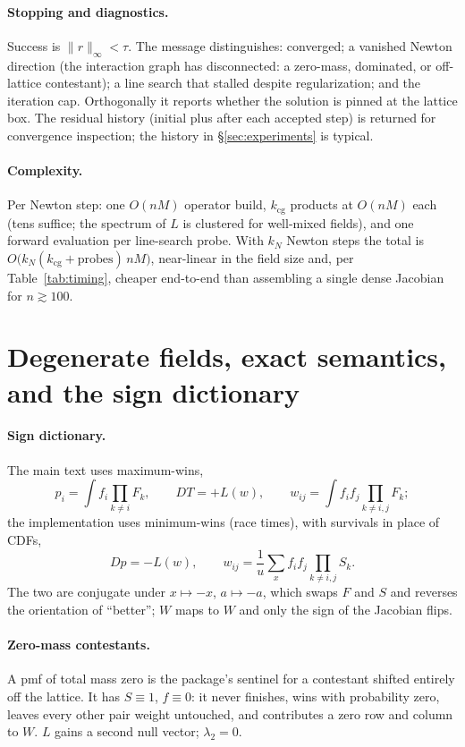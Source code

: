 \documentclass[11pt]{article}
\theoremstyle{definition}
\theoremstyle{remark}
\begin{document}
\paragraph{Stopping and diagnostics.}
Success is $\|r\|_\infty < \tau$.  The message distinguishes: converged; a
vanished Newton direction (the interaction graph has disconnected: a
zero-mass, dominated, or off-lattice contestant); a line search that
stalled despite regularization; and the iteration cap.  Orthogonally it
reports whether the solution is pinned at the lattice box.  The residual history (initial plus
after each accepted step) is returned for convergence inspection; the
history in \S\ref{sec:experiments} is typical.

\paragraph{Complexity.}
Per Newton step: one $O(nM)$ operator build, $k_{\mathrm{cg}}$ products at
$O(nM)$ each (tens suffice; the spectrum of $L$ is clustered for
well-mixed fields), and one forward evaluation per line-search probe.  With
$k_N$ Newton steps the total is
$O\bigl(k_N (k_{\mathrm{cg}} + \text{probes})\, nM\bigr)$, near-linear in
the field size and, per Table~\ref{tab:timing}, cheaper end-to-end than
assembling a single dense Jacobian for $n \gtrsim 100$.

\section{Degenerate fields, exact semantics, and the sign dictionary}
\label{app:degenerate}

\paragraph{Sign dictionary.}
The main text uses maximum-wins,
\[
  p_i = \int f_i \prod_{k \ne i} F_k, \qquad
  DT = +L(w), \qquad
  w_{ij} = \int f_i f_j \prod_{k\ne i,j} F_k ;
\]
the implementation uses minimum-wins (race times), with survivals in place
of CDFs,
\[
  Dp = -L(w), \qquad
  w_{ij} = \frac1u \sum_x f_i f_j \prod_{k \ne i,j} S_k .
\]
The two are conjugate under $x \mapsto -x$, $a \mapsto -a$, which swaps
$F$ and $S$ and reverses the orientation of ``better''; $W$ maps to $W$
and only the sign of the Jacobian flips.

\paragraph{Zero-mass contestants.}
A pmf of total mass zero is the package's sentinel for a contestant shifted
entirely off the lattice.  It has $S \equiv 1$, $f \equiv 0$: it never
finishes, wins with probability zero, leaves every other pair weight
untouched, and contributes a zero row and column to $W$.  $L$ gains a
second null vector; $\lambda_2 = 0$.
\end{document}
